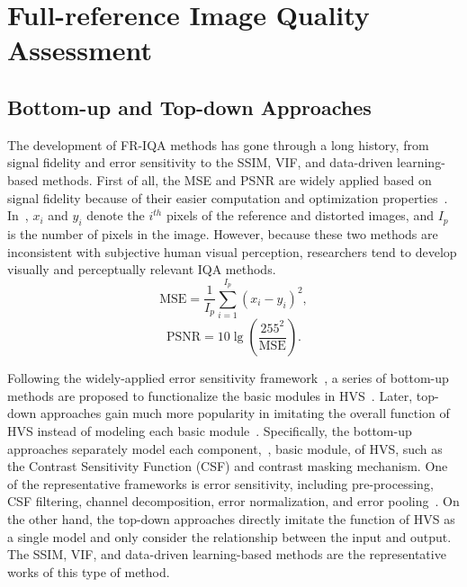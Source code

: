 \section{Full-reference Image Quality Assessment}
\subsection{Bottom-up and Top-down Approaches}
The development of FR-IQA methods has gone through a long history, from signal fidelity and error sensitivity to the SSIM, VIF, and data-driven learning-based methods. First of all, the MSE and PSNR are widely applied based on signal fidelity because of their easier computation and optimization properties~\citep{wang2004image}. In~, $x_i$ and $y_i$ denote the $i^{th}$ pixels of the reference and distorted images, and $I_{p}$ is the number of pixels in the image. However, because these two methods are inconsistent with subjective human visual perception, researchers tend to develop visually and perceptually relevant IQA methods.
\begin{equation}
	\mathrm{MSE}=\frac{1}{I_{p}} \sum_{i=1}^{I_{p}}\left(x_i-y_i\right)^2,
	\label{MSE}
\end{equation}
\begin{equation}
	\mathrm{PSNR}=10 \lg{\left(\frac{255^2}{\mathrm{MSE}}\right)}.
	\label{PSNR}
\end{equation}

Following the widely-applied error sensitivity framework~\citep{wang2004image}, a series of bottom-up methods are proposed to functionalize the basic modules in HVS~\citep{daly1992visible, lubin1993use, watson1997visibility}. Later, top-down approaches gain much more popularity in imitating the overall function of HVS instead of modeling each basic module~\citep{wang2004image}. Specifically, the bottom-up approaches separately model each component,~\ie, basic module, of HVS, such as the Contrast Sensitivity Function (CSF) and contrast masking mechanism. One of the representative frameworks is error sensitivity, including pre-processing, CSF filtering, channel decomposition, error normalization, and error pooling~\citep{wang2004image}. On the other hand, the top-down approaches directly imitate the function of HVS as a single model and only consider the relationship between the input and output. The SSIM, VIF, and data-driven learning-based methods are the representative works of this type of method.

